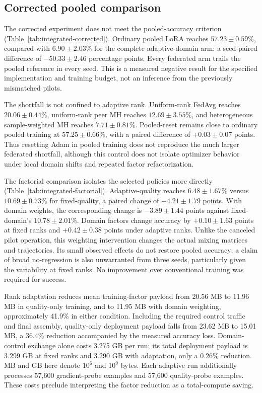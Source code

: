 \documentclass[11pt]{article}
\begin{document}
\subsection{Corrected pooled comparison}


The corrected experiment does not meet the pooled-accuracy criterion (Table~\ref{tab:integrated-corrected}). Ordinary pooled LoRA reaches $57.23\pm0.59\%$, compared with $6.90\pm2.03\%$ for the complete adaptive-domain arm: a seed-paired difference of $-50.33\pm2.46$ percentage points. Every federated arm trails the pooled reference in every seed. This is a measured negative result for the specified implementation and training budget, not an inference from the previously mismatched pilots.

The shortfall is not confined to adaptive rank. Uniform-rank FedAvg reaches $20.06\pm0.44\%$, uniform-rank peer MH reaches $12.69\pm3.55\%$, and heterogeneous sample-weighted MH reaches $7.71\pm0.81\%$. Pooled-reset remains close to ordinary pooled training at $57.25\pm0.66\%$, with a paired difference of $+0.03\pm0.07$ points. Thus resetting Adam in pooled training does not reproduce the much larger federated shortfall, although this control does not isolate optimizer behavior under local domain shifts and repeated factor refactorization.

The factorial comparison isolates the selected policies more directly (Table~\ref{tab:integrated-factorial}). Adaptive-quality reaches $6.48\pm1.67\%$ versus $10.69\pm0.73\%$ for fixed-quality, a paired change of $-4.21\pm1.79$ points. With domain weights, the corresponding change is $-3.89\pm1.44$ points against fixed-domain's $10.78\pm2.01\%$. Domain factors change accuracy by $+0.10\pm1.63$ points at fixed ranks and $+0.42\pm0.38$ points under adaptive ranks. Unlike the canceled pilot operation, this weighting intervention changes the actual mixing matrices and trajectories. Its small observed effects do not restore pooled accuracy; a claim of broad no-regression is also unwarranted from three seeds, particularly given the variability at fixed ranks. No improvement over conventional training was required for success.

Rank adaptation reduces mean training-factor payload from 20.56 MB to 11.96 MB in quality-only training, and to 11.95 MB with domain weighting, approximately 41.9\% in either condition. Including the required control traffic and final assembly, quality-only deployment payload falls from 23.62 MB to 15.01 MB, a 36.4\% reduction accompanied by the measured accuracy loss. Domain-control exchange alone costs 3.275 GB per run; its total deployment payload is 3.299 GB at fixed ranks and 3.290 GB with adaptation, only a 0.26\% reduction. MB and GB here denote $10^6$ and $10^9$ bytes. Each adaptive run additionally processes 57,600 gradient-probe examples and 57,600 quality-probe examples. These costs preclude interpreting the factor reduction as a total-compute saving.
\end{document}
